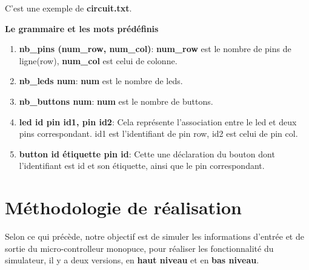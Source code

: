 \documentclass[14px]{article}
\begin{document}
C'est une exemple de \textbf{circuit.txt}.
\begin{figure}[htbp]
\end{figure}

\textbf{Le grammaire et les mots prédéfinis}
\begin{enumerate}
	\item \textbf{nb\_pins (num\_row, num\_col)}: \textbf{num\_row} est le nombre de pins de ligne(row), \textbf{num\_col} est celui de colonne.
	\item \textbf{nb\_leds num}: \textbf{num} est le nombre de leds.
	\item \textbf{nb\_buttons num}: \textbf{num} est le nombre de buttons.
	\item \textbf{led id pin id1, pin id2}: Cela représente l'association entre le led et deux pins correspondant. id1 est l'identifiant de pin row, id2 est celui de pin col.
	\item \textbf{button id étiquette pin id}: Cette une déclaration du bouton dont l'identifiant est id et son étiquette, ainsi que le pin correspondant.
\end{enumerate}

\clearpage
\pagestyle{fancy}
\rhead{\thepage}
\fancyfoot{}

\clearpage

\section{Méthodologie de réalisation}
Selon ce qui précède, notre objectif est de simuler les informations d'entrée et de sortie du micro-controlleur monopuce, pour réaliser les fonctionnalité du simulateur, il y a deux versions, en \textbf{haut niveau} et en \textbf{bas niveau}.
\end{document}
